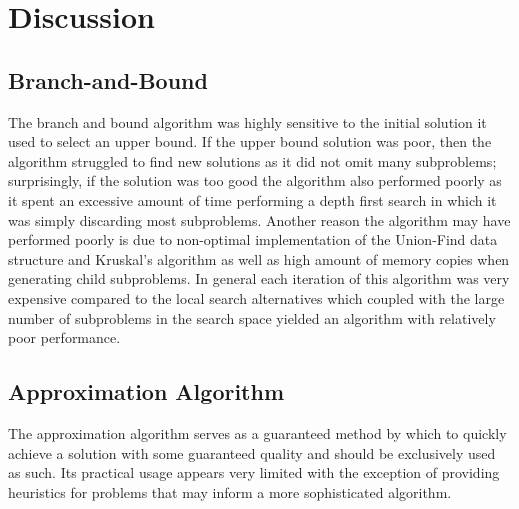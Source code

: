 \documentclass[format=sigconf]{acmart}
\begin{document}
\section{Discussion}
\subsection{Branch-and-Bound}
 The branch and bound algorithm was highly sensitive to the initial solution it used to select an upper bound. If the upper bound solution was poor, then the algorithm struggled to find new solutions as it did not omit many subproblems; surprisingly, if the solution was too good the algorithm also performed poorly as it spent an excessive amount of time performing a depth first search in which it was simply discarding most subproblems. Another reason the algorithm may have performed poorly is due to non-optimal implementation of the Union-Find data structure and Kruskal's algorithm as well as high amount of memory copies when generating child subproblems. In general each iteration of this algorithm was very expensive compared to the local search alternatives which coupled with the large number of subproblems in the search space yielded an algorithm with relatively poor performance.
\subsection{Approximation Algorithm}
The approximation algorithm serves as a guaranteed method by which to quickly achieve a solution with some guaranteed quality and should be exclusively used as such. Its practical usage appears very limited with the exception of providing heuristics for problems that may inform a more sophisticated algorithm.
\end{document}
